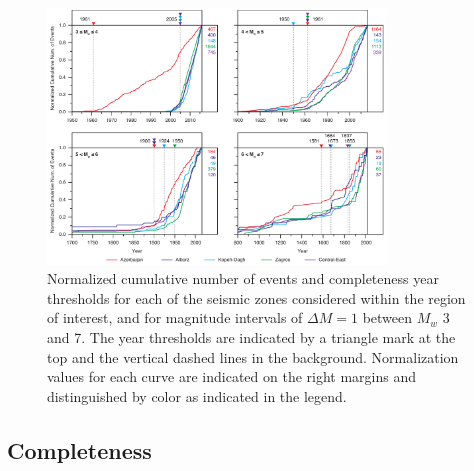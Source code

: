 
\begin{figure}[t]
    \centering
    \includegraphics[width=0.8\textwidth]{figures/pdf/figure-05.pdf} 
    \caption{Normalized cumulative number of events and completeness year thresholds for each of the seismic zones considered within the region of interest, and for magnitude intervals of $\Delta M = 1$ between $M_w$ 3 and 7. The year thresholds are indicated by a triangle mark at the top and the vertical dashed lines in the background. Normalization values for each curve are indicated on the right margins and distinguished by color as indicated in the legend.}
    \label{fig:completeness}
\end{figure}

\subsection{Completeness}

